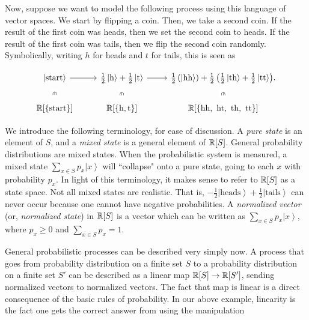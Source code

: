 \documentclass{article}
\theoremstyle{definition}
\numberwithin{figure}{section}
\begin{document}
Now, suppose we want to model the following process using this language of vector spaces. We start by flipping a coin. Then, we take a second coin. If the result of the first coin was heads, then we set the second coin to heads. If the result of the first coin was tails, then we flip the second coin randomly. Symbolically, writing $h$ for heads and $t$ for tails, this is seen as

\[\begin{tikzcd}
	{\left|\text{start}\right>} & {\frac{1}{2}\left|\text{h}\right>+\frac{1}{2}\left|\text{t}\right>} & {\frac{1}{2}\left(\left|\text{hh}\right>\right)+\frac{1}{2}\left(\frac{1}{2}\left|\text{th}\right>+\frac{1}{2}\left|\text{tt}\right>\right)}. \\
	{\mathbb{R}[\{\text{start}\}]} & {\mathbb{R}[\{\text{h},\text{t}\}]} & {\mathbb{R}[\{\text{hh,\, ht,\, th,\, tt}\}]}
	\arrow[from=1-1, to=1-2]
	\arrow[from=1-2, to=1-3]
	\arrow["\vin"{description}, draw=none, from=1-1, to=2-1]
	\arrow["\vin"{description}, draw=none, from=1-2, to=2-2]
	\arrow["\vin"{description}, draw=none, from=1-3, to=2-3]
\end{tikzcd}\]

We introduce the following terminology, for ease of discussion. A \textit{pure state} is an element of $S$, and a \textit{mixed state} is a general element of $\mathbb{R}[S]$. General probability distributions are mixed states. When the probabilistic system is measured, a mixed state $\sum_{x\in S}p_x\left| x\right>$ will ``collapse" onto a pure state, going to each $x$ with probability $p_x$. In light of this terminology, it makes sense to refer to $\mathbb{R}[S]$ as a state space. Not all mixed states are realistic. That is, $-\frac{1}{2}\left|\text{heads}\right>+\frac{1}{2}\left|\text{tails}\right>$ can never occur because one cannot have negative probabilities. A \textit{normalized vector} (or, \textit{normalized state}) in $\mathbb{R}[S]$ is a vector which can be written as $\sum_{x\in S}p_x \left |x \right>$, where $p_x\geq 0$ and $\sum_{x\in S}p_x=1$.

General probabilistic processes can be described very simply now. A process that goes from probability distribution on a finite set $S$ to a probability distribution on a finite set $S'$ can be described as a linear map $\mathbb{R}[S]\to \mathbb{R}[S']$, sending normalized vectors to normalized vectors. The fact that map is linear is a direct consequence of the basic rules of probability. In our above example, linearity is the fact one gets the correct answer from using the manipulation
\end{document}
